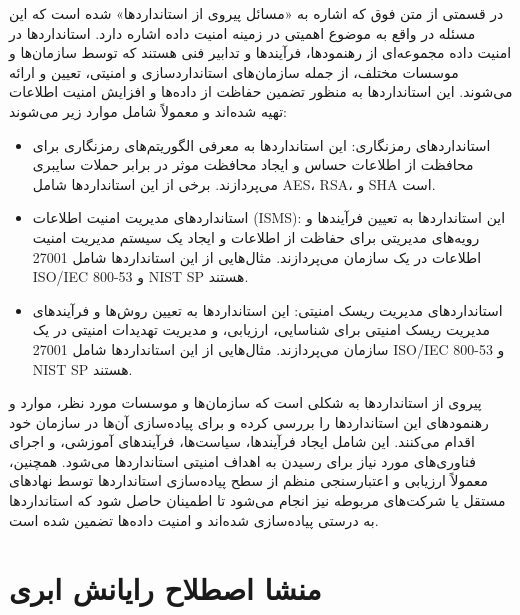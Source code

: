 \documentclass{book}
\begin{document}
        \begin{addinfo2}
            
            در قسمتی از متن فوق که اشاره به «مسائل پیروی از استانداردها» شده است که این مسئله در واقع به موضوع اهمیتی در زمینه امنیت داده اشاره دارد. استانداردها در امنیت داده مجموعه‌ای از رهنمودها، فرآیندها و تدابیر فنی هستند که توسط سازمان‌ها و موسسات مختلف، از جمله سازمان‌های استانداردسازی و امنیتی، تعیین و ارائه می‌شوند. این استانداردها به منظور تضمین حفاظت از داده‌ها و افزایش امنیت اطلاعات تهیه شده‌اند و معمولاً شامل موارد زیر می‌شوند:

            \begin{itemize}
                
                \item استانداردهای رمزنگاری: این استانداردها به معرفی الگوریتم‌های رمزنگاری برای محافظت از اطلاعات حساس و ایجاد محافظت موثر در برابر حملات سایبری می‌پردازند. برخی از این استانداردها شامل AES، RSA، و SHA است.

                \item استانداردهای مدیریت امنیت اطلاعات (ISMS): این استانداردها به تعیین فرآیندها و رویه‌های مدیریتی برای حفاظت از اطلاعات و ایجاد یک سیستم مدیریت امنیت اطلاعات در یک سازمان می‌پردازند. مثال‌هایی از این استانداردها شامل 27001 ISO/IEC و 53-800 NIST SP هستند.

                \item استانداردهای مدیریت ریسک امنیتی: این استانداردها به تعیین روش‌ها و فرآیندهای مدیریت ریسک امنیتی برای شناسایی، ارزیابی، و مدیریت تهدیدات امنیتی در یک سازمان می‌پردازند. مثال‌هایی از این استانداردها شامل 27001 ISO/IEC و 53-800 NIST SP هستند.

            \end{itemize}

            پیروی از استانداردها به شکلی است که سازمان‌ها و موسسات مورد نظر، موارد و رهنمودهای این استانداردها را بررسی کرده و برای پیاده‌سازی آن‌ها در سازمان خود اقدام می‌کنند. این شامل ایجاد فرآیندها، سیاست‌ها، فرآیندهای آموزشی، و اجرای فناوری‌های مورد نیاز برای رسیدن به اهداف امنیتی استانداردها می‌شود. همچنین، معمولاً ارزیابی و اعتبارسنجی منظم از سطح پیاده‌سازی استانداردها توسط نهادهای مستقل یا شرکت‌های مربوطه نیز انجام می‌شود تا اطمینان حاصل شود که استانداردها به درستی پیاده‌سازی شده‌اند و امنیت داده‌ها تضمین شده است.

        \end{addinfo2}

        \section{منشا اصطلاح رایانش ابری}
\end{document}
